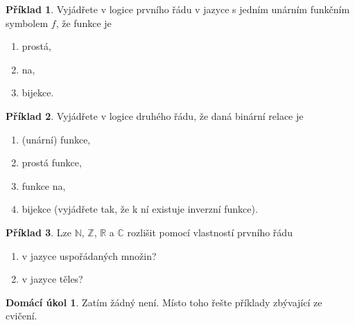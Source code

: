 \documentclass[a4paper]{article}
\theoremstyle{definition}
\newtheorem{problem}{Příklad}
\newtheorem*{ukol}{Domácí úkol}
\begin{document}
\medskip\begin{problem} Vyjádřete v logice prvního řádu v jazyce s jedním unárním funkčním symbolem $f$, že funkce je
\begin{enumerate}
    \item prostá,
    \item na,
    \item bijekce.
\end{enumerate}
\end{problem}


\medskip\begin{problem} Vyjádřete v logice druhého řádu, že daná binární relace je 
\begin{enumerate}
    \item (unární) funkce,
    \item prostá funkce,
    \item funkce na,
    \item bijekce (vyjádřete tak, že k ní existuje inverzní funkce).
\end{enumerate}
\end{problem}


\medskip\begin{problem}
Lze $\mathbb N$, $\mathbb Z$, $\mathbb R$ a $\mathbb C$ rozlišit pomocí vlastností prvního řádu
\begin{enumerate}
    \item v jazyce uspořádaných množin?
    \item v jazyce těles?
\end{enumerate}
\end{problem}


\medskip\begin{ukol}
Zatím žádný není. Místo toho řešte příklady zbývající ze cvičení.
\end{ukol}
\end{document}
